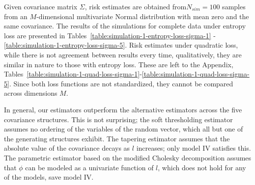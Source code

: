 \bigskip
Given covariance matrix $\Sigma$, risk estimates are obtained from$N_{sim} = 100$ samples from an $M$-dimensional multivariate Normal distribution with mean zero and the same covariance.  The results of the simulations for complete data under entropy loss are presented in Tables~\ref{table:simulation-1-entropy-loss-sigma-1} - \ref{table:simulation-1-entropy-loss-sigma-5}. Risk estimates under quadratic loss, while there is not agreement between results every time, qualitatively, they are similar in nature to those with entropy loss. These are left to the Appendix, Tables~\ref{table:simulation-1-quad-loss-sigma-1}-\ref{table:simulation-1-quad-loss-sigma-5}. Since both loss functions are not standardized, they cannot be compared across dimensions $M$.

\bigskip


\bigskip

In general, our estimators outperform the alternative estimators across the five covariance structures. This is not surprising; the soft thresholding estimator assumes no ordering of the variables of the random vector, which all but one of the generating structures exhibit. The tapering estimator assumes that the absolute value of the covariance decays as $l$ increases; only model IV satisfies this. The parametric estimator based on the modified Cholesky decomposition assumes that $\phi$ can be modeled as a univariate function of $l$, which does not hold for any of the models, save model IV.

\bigskip

